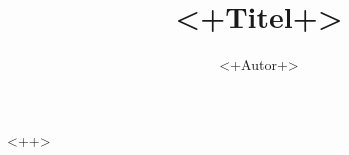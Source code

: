\documentclass[a4paper,12pt]{scrartcl}
\title{<+Titel+>}
\author{<+Autor+>}
\begin{document}
\onehalfspacing%
<++>
\end{document}
